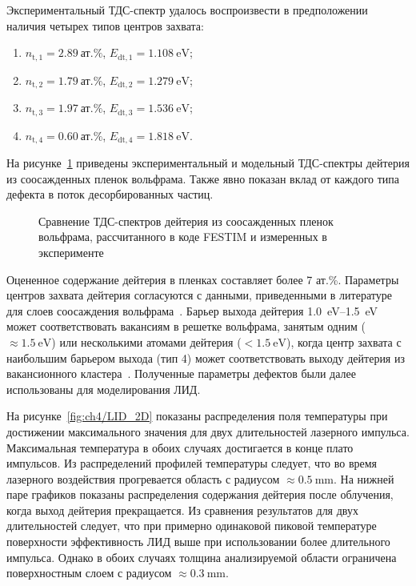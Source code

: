 Экспериментальный ТДС-спектр удалось воспроизвести в предположении наличия четырех типов центров захвата:
\begin{enumerate}[beginpenalty=10000]
    \item \( n_\mathrm{t,1}=\SI{2.89}{\text{ат.}\percent} \), \( E_\mathrm{dt,1}=\SI{1.108}{\electronvolt} \);
    \item \( n_\mathrm{t,2}=\SI{1.79}{\text{ат.}\percent} \), \( E_\mathrm{dt,2}=\SI{1.279}{\electronvolt} \);
    \item \( n_\mathrm{t,3}=\SI{1.97}{\text{ат.}\percent} \), \( E_\mathrm{dt,3}=\SI{1.536}{\electronvolt} \);
    \item \( n_\mathrm{t,4}=\SI{0.60}{\text{ат.}\percent} \), \( E_\mathrm{dt,4}=\SI{1.818}{\electronvolt} \).
\end{enumerate}
На рисунке~\cref{fig:ch4/LID_TDS} приведены экспериментальный и модельный ТДС-спектры дейтерия из соосажденных пленок вольфрама. Также явно показан вклад от каждого типа дефекта в поток десорбированных частиц.

\begin{figure}[ht]
    \caption{Сравнение ТДС-спектров дейтерия из соосажденных пленок вольфрама, рассчитанного в коде FESTIM и измеренных в эксперименте}\label{fig:ch4/LID_TDS}
\end{figure}

Оцененное содержание дейтерия в пленках составляет более 7 ат.\%. Параметры центров захвата дейтерия согласуются с данными, приведенными в литературе для слоев соосаждения вольфрама~\cite{Krat2018}. Барьер выхода дейтерия \SIrange{1.0}{1.5}{\electronvolt} может соответствовать вакансиям в решетке вольфрама, занятым одним (\(\approx\SI{1.5}{\electronvolt}\)) или несколькими атомами дейтерия (\(<\SI{1.5}{\electronvolt}\)), когда центр захвата с наибольшим барьером выхода (тип 4) может соответствовать выходу дейтерия из вакансионного кластера~\cite{Ogorodnikova2015}. Полученные параметры дефектов были далее использованы для моделирования ЛИД.

На рисунке~\cref{fig:ch4/LID_2D} показаны распределения поля температуры при достижении максимального значения для двух длительностей лазерного импульса. Максимальная температура в обоих случаях достигается в конце плато импульсов. Из распределений профилей температуры следует, что во время лазерного воздействия прогревается область с радиусом \( \approx \SI{0.5}{\milli\meter} \). На нижней паре графиков показаны распределения содержания дейтерия после облучения, когда выход дейтерия прекращается. Из сравнения результатов для двух длительностей следует, что при примерно одинаковой пиковой температуре поверхности эффективность ЛИД выше при использовании более длительного импульса. Однако в обоих случаях толщина анализируемой области ограничена поверхностным слоем с радиусом \(\approx\SI{0.3}{\milli\meter}\).

